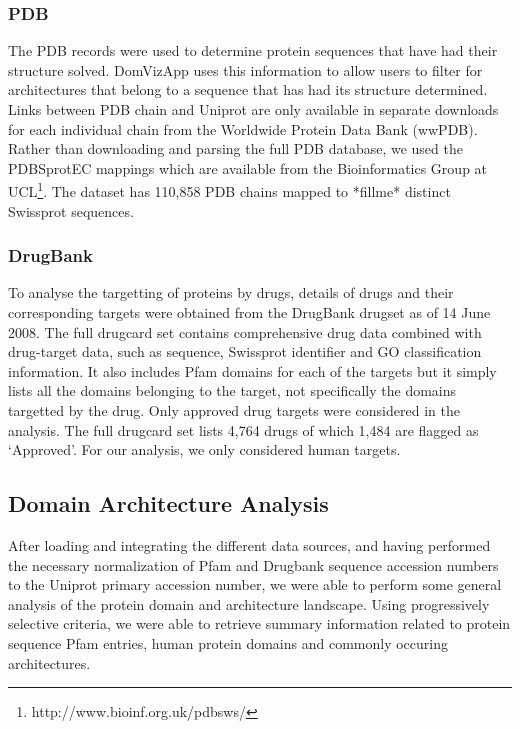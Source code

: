 \subsubsection{PDB}
The PDB records were used to determine protein sequences that have had their structure solved. DomVizApp uses this information to allow users to filter for architectures that belong to a sequence that has had its structure determined. Links between PDB chain and Uniprot are only available in separate downloads for each individual chain from the Worldwide Protein Data Bank (wwPDB). Rather than downloading and parsing the full PDB database, we used the PDBSprotEC mappings \cite{pdbsprotec} which are available from the Bioinformatics Group at UCL\footnote{http://www.bioinf.org.uk/pdbsws/}. The dataset has 110,858 PDB chains mapped to *fillme* distinct Swissprot sequences. 

\subsubsection{DrugBank}
To analyse the targetting of proteins by drugs, details of drugs and their corresponding targets were obtained from the DrugBank \cite{drugbank} drugset as of 14 June 2008. The full drugcard set contains comprehensive drug data combined with drug-target data, such as sequence, Swissprot identifier and GO classification information. It also includes Pfam domains for each of the targets but it simply lists all the domains belonging to the target, not specifically the domains targetted by the drug. Only approved drug targets were considered in the analysis. The full drugcard set lists 4,764 drugs of which 1,484 are flagged as `Approved'. For our analysis, we only considered human targets.

\subsection{Domain Architecture Analysis}
After loading and integrating the different data sources, and having performed the necessary normalization of Pfam and Drugbank sequence accession numbers to the Uniprot primary accession number, we were able to perform some general analysis of the protein domain and architecture landscape. Using progressively selective criteria, we were able to retrieve summary information related to protein sequence Pfam entries, human protein domains and commonly occuring architectures.

